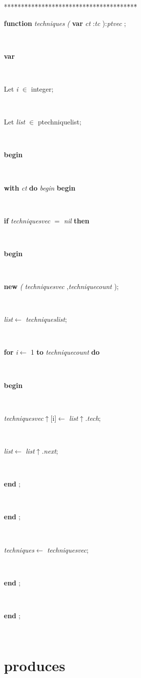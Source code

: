 \begin{tabbing}
***\=***\=***\=***\=***\=***\=***\=***\=***\=***\=***\=***\=***\=\kill
\parbox{14cm}{\textsf{\textbf{function}   \textit{techniques} \textit{(} \textbf{var}  \textit{ct} :\textit{tc} ):\textit{ptvec} ;}}\\
\+\parbox{14cm}{\textsf{\textbf{var} }}\\
\parbox{14cm}{\textsf{Let \textit{i} $\in$ integer;}}\\
\parbox{14cm}{\textsf{Let \textit{list} $\in$ ptechniquelist;}}\\
\-\<\+\parbox{14cm}{\textsf{\textbf{begin} }}\\
\+\<\parbox{14cm}{\textsf {\textbf {with } \textsf{\textit{ct}} \textbf{ do } \textsf{\textit{begin}} \textbf{ begin } }}\\
\+\parbox{14cm}{\textsf {\textbf {if } \textsf{\textit{techniquesvec} $=$ \textit{nil}} \textbf{ then } }}\\
\<\parbox{14cm}{\textsf{\textbf{begin} }}\\
\parbox{14cm}{\textsf{\textbf{new} \textit{(} \textit{techniquesvec} ,\textit{techniquecount} );}}\\
\parbox{14cm}{\textsf{\textit{list}$\leftarrow$ \textit{techniqueslist}}; }\\
\+\parbox{14cm}{\textsf {\textbf {for } \textsf{\textit{i}$\leftarrow$ 1} \textbf{ to } \textsf{\textit{techniquecount}} \textbf{ do } }}\\
\<\parbox{14cm}{\textsf{\textbf{begin} }}\\
\parbox{14cm}{\textsf{\textit{techniquesvec}$\uparrow$\textit{}[i]$\leftarrow$ \textit{list}$\uparrow$.\textit{tech}}; }\\
\parbox{14cm}{\textsf{\textit{list}$\leftarrow$ \textit{list}$\uparrow$.\textit{next}}; }\\
\<\-\parbox{14cm}{\textsf{\textbf{end} ;}}\\
\<\-\parbox{14cm}{\textsf{\textbf{end} ;}}\\
\parbox{14cm}{\textsf{\textit{techniques}$\leftarrow$ \textit{techniquesvec}}; }\\
\<\-\parbox{14cm}{\textsf{\textbf{end} ;}}\\
\<\-\parbox{14cm}{\textsf{\textbf{end} ;}}\\
\end{tabbing}
\section{produces}\label{sec:technologiesproduces}

